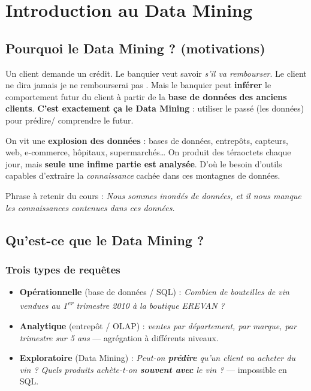 \chapter{Introduction au Data Mining}

\section{Pourquoi le Data Mining ? (motivations)}

\begin{Exemple}[le banquier]
Un client demande un crédit. Le banquier veut savoir \emph{s'il va rembourser}. Le client
ne dira jamais \og je ne rembourserai pas \fg{}. Mais le banquier peut \textbf{inférer} le
comportement futur du client à partir de la \textbf{base de données des anciens clients}.
\textbf{C'est exactement ça le Data Mining} : utiliser le passé (les données) pour prédire/
comprendre le futur.
\end{Exemple}

On vit une \textbf{explosion des données} : bases de données, entrepôts, capteurs,
web, e-commerce, hôpitaux, supermarchés… On produit des téraoctets chaque jour, mais
\textbf{seule une infime partie est analysée}. D'où le besoin d'outils capables d'extraire la
\emph{connaissance} cachée dans ces montagnes de données.

\begin{Astuce}
Phrase à retenir du cours : \og \emph{Nous sommes inondés de données, et il nous manque les
connaissances contenues dans ces données.} \fg{}
\end{Astuce}

\section{Qu'est-ce que le Data Mining ?}

\subsection{Trois types de requêtes}
\begin{itemize}[leftmargin=1.4em]
  \item \textbf{Opérationnelle} (base de données / SQL) : \emph{\og Combien de bouteilles de
        vin vendues au 1\textsuperscript{er} trimestre 2010 à la boutique EREVAN ? \fg{}}
  \item \textbf{Analytique} (entrepôt / OLAP) : \emph{\og ventes par département, par marque,
        par trimestre sur 5 ans \fg{}} — agrégation à différents niveaux.
  \item \textbf{Exploratoire} (Data Mining) : \emph{\og Peut-on \textbf{prédire} qu'un client
        va acheter du vin ? Quels produits achète-t-on \textbf{souvent avec} le vin ? \fg{}}
        — impossible en SQL.
\end{itemize}

